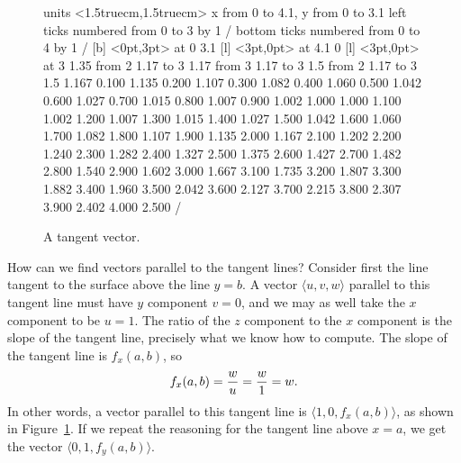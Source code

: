 \begin{figure}[H]
\centerline{
\vbox{\beginpicture
\normalgraphs
\setcoordinatesystem units <1.5truecm,1.5truecm>
\setplotarea x from 0 to 4.1, y from 0 to 3.1
\axis left ticks numbered from 0 to 3 by 1 /
\axis bottom ticks numbered from 0 to 4 by 1 /
 [b] <0pt,3pt> at 0 3.1
 [l] <3pt,0pt> at 4.1 0
 [l] <3pt,0pt> at 3 1.35
\putrule from 2 1.17 to 3 1.17
\putrule from 3 1.17 to 3 1.5
\setlinear
\arrow <5pt> [0.17, 0.5] from 2 1.17 to 3 1.5
\setquadratic
{} 1.167 0.100 1.135 0.200 1.107 0.300 1.082 0.400 1.060 
0.500 1.042 0.600 1.027 0.700 1.015 0.800 1.007 0.900 1.002 
1.000 1.000 1.100 1.002 1.200 1.007 1.300 1.015 1.400 1.027 
1.500 1.042 1.600 1.060 1.700 1.082 1.800 1.107 1.900 1.135 
2.000 1.167 2.100 1.202 2.200 1.240 2.300 1.282 2.400 1.327 
2.500 1.375 2.600 1.427 2.700 1.482 2.800 1.540 2.900 1.602 
3.000 1.667 3.100 1.735 3.200 1.807 3.300 1.882 3.400 1.960 
3.500 2.042 3.600 2.127 3.700 2.215 3.800 2.307 3.900 2.402 
4.000 2.500 /
\endpicture}}
\caption{A tangent vector.}
\label{fig:tangent vector}
\end{figure}

How can we find vectors parallel to the tangent lines? Consider first
the line tangent to the surface above the line $y=b$. A vector
$\langle u,v,w\rangle$ parallel to this tangent line must have $y$
component $v=0$, and we may as well take the $x$ component to be
$u=1$. The ratio of the $z$ component to the $x$ component is the
slope of the tangent line, precisely what we know how to compute. The
slope of the tangent line is $f_x(a,b)$, so
$$ f_x(a,b)={w\over u} ={w\over1} = w.$$
In other words, a vector parallel to this tangent line is
$\langle 1,0,f_x(a,b)\rangle$, as shown in Figure~\ref{fig:tangent vector}. 
If we repeat the reasoning for the
tangent line above $x=a$, we get the vector $\langle
0,1,f_y(a,b)\rangle$.

